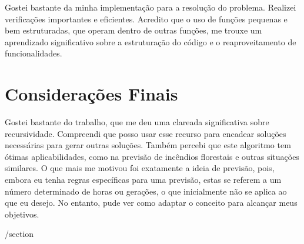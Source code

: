 \documentclass{article}
\begin{document}
Gostei bastante da minha implementação para a resolução do problema. Realizei verificações importantes e eficientes. Acredito que o uso de funções pequenas e bem estruturadas, que operam dentro de outras funções, me trouxe um aprendizado significativo sobre a estruturação do código e o reaproveitamento de funcionalidades. 

\clearpage
\section{Considerações Finais}
Gostei bastante do trabalho, que me deu uma clareada significativa sobre recursividade. Compreendi que posso usar esse recurso para encadear soluções necessárias para gerar outras soluções. Também percebi que este algoritmo tem ótimas aplicabilidades, como na previsão de incêndios florestais e outras situações similares. O que mais me motivou foi exatamente a ideia de previsão, pois, embora eu tenha regras específicas para uma previsão, estas se referem a um número determinado de horas ou gerações, o que inicialmente não se aplica ao que eu desejo. No entanto, pude ver como adaptar o conceito para alcançar meus objetivos. 

\clearpage



/section 
\end{document}
